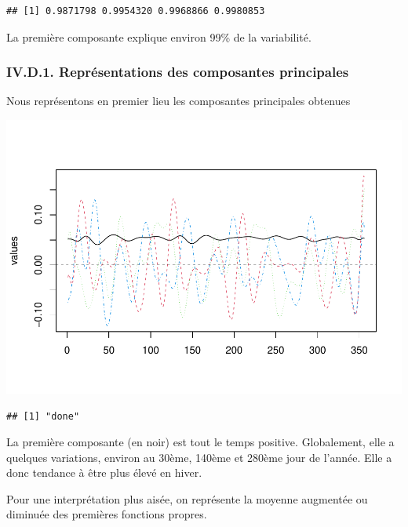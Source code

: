 \documentclass[
]{article}
\newenvironment{Shaded}{\begin{snugshade}}{\end{snugshade}}
\newcommand{\FunctionTok}[1]{\textcolor[rgb]{0.00,0.00,0.00}{#1}}
\newcommand{\NormalTok}[1]{#1}
\newcommand{\SpecialCharTok}[1]{\textcolor[rgb]{0.00,0.00,0.00}{#1}}
\begin{document}
\begin{verbatim}
## [1] 0.9871798 0.9954320 0.9968866 0.9980853
\end{verbatim}

La première composante explique environ 99\% de la variabilité.

\hypertarget{iv.d.1.-repruxe9sentations-des-composantes-principales}{%
\subsubsection{IV.D.1. Représentations des composantes
principales}\label{iv.d.1.-repruxe9sentations-des-composantes-principales}}

Nous représentons en premier lieu les composantes principales obtenues

\begin{Shaded}
\end{Shaded}

\includegraphics{Projet_CHESNAIS_GUIBERT_files/figure-latex/unnamed-chunk-45-1.pdf}

\begin{verbatim}
## [1] "done"
\end{verbatim}

La première composante (en noir) est tout le temps positive.
Globalement, elle a quelques variations, environ au 30ème, 140ème et
280ème jour de l'année. Elle a donc tendance à être plus élevé en hiver.

Pour une interprétation plus aisée, on représente la moyenne augmentée
ou diminuée des premières fonctions propres.
\end{document}
